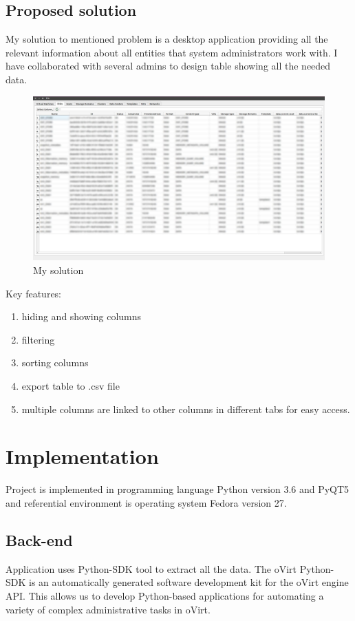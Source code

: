 \section{Proposed solution}
My solution to mentioned problem is a desktop application providing all the relevant information about all entities that system administrators work with. I have collaborated with several admins to design table showing all the needed data.

\begin{figure}[H]
\centering
\includegraphics[scale=0.2]{tabulka.jpg}
\caption{My solution}
\end{figure}

Key features:
\begin{enumerate}
\item hiding and showing columns
\item filtering
\item sorting columns
\item export table to .csv file
\item multiple columns are linked to other columns in different tabs for easy access.
\end{enumerate}


\chapter{Implementation}
Project is implemented in programming language Python version 3.6 and PyQT5 and referential environment is operating system Fedora version 27.

\section{Back-end}
Application uses Python-SDK tool to extract all the data. The oVirt Python-SDK is an automatically generated software development kit for the oVirt engine API. This allows us to develop Python-based applications for automating a variety of complex administrative tasks in oVirt.

